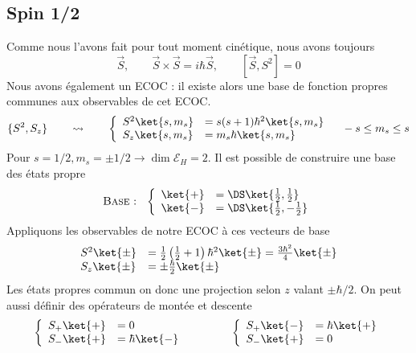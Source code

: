 	\subsection{Spin 1/2}
	Comme nous l'avons fait pour tout moment cinétique, nous avons toujours
	\begin{equation}	
	\vec{S},\qquad \vec{S}\times\vec{S} = i\hbar\vec{S},\qquad [\vec{S},S^2]=0
	\end{equation}
	Nous avons également un ECOC : il existe alors une base de fonction propres communes 
	aux observables de cet ECOC.
	\begin{equation}
	\{S^2,S_z\}\qquad \rightsquigarrow\qquad \left\{\begin{array}{ll}
	S^2\ket{s,m_s} &= s(s+1)\hbar^2 \ket{s,m_s}\\
	S_z\ket{s,m_s} &= m_s\hbar \ket{s,m_s}	
	\end{array}\right.\quad -s\leq m_s\leq s
	\end{equation}
	Pour $s=1/2, m_s = \pm 1/2 \rightarrow \dim\mathcal{E}_H = 2$. Il est possible de construire 
	une base des états propre
	\begin{equation}
	\text{\textsc{Base} : }\ \left\{\begin{array}{ll}
	\ket{+} &=\DS \ket{\frac{1}{2},\frac{1}{2}}\\
	\ket{-} &=\DS \ket{\frac{1}{2},-\frac{1}{2}}	
	\end{array}\right.
	\end{equation}
	Appliquons les observables de notre ECOC à ces vecteurs de base
	\begin{equation}
	\begin{array}{ll}
	S^2\ket{\pm} &= \frac{1}{2}\left(\frac{1}{2}+1\right)\hbar^2\ket{\pm} = \frac{3\hbar^2}{4}\ket{\pm}\\
	S_z\ket{\pm} &= \pm\frac{\hbar}{2}\ket{\pm}
	\end{array} 
	\end{equation}
	Les états propres commun on donc une projection selon $z$ valant $\pm \hbar/2$.
	On peut aussi définir des opérateurs de montée et descente
	\begin{equation}
	\left\{\begin{array}{ll}
	S_+\ket{+} &= 0\\
	S_-\ket{+} &= \hbar\ket{-}
	\end{array}\right.\qquad\qquad\left\{\begin{array}{ll}
	S_+\ket{-} &= \hbar\ket{+}\\
	S_-\ket{+} &= 0
	\end{array}\right.
	\end{equation}

